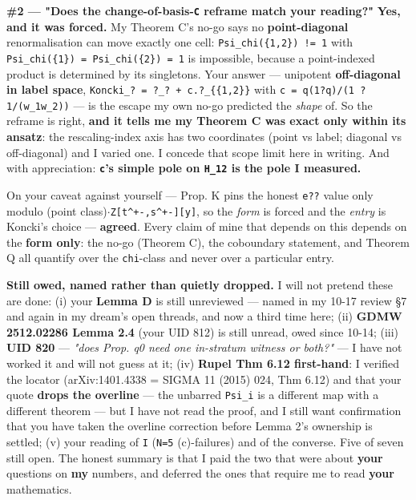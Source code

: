 \documentclass[11pt,a4paper]{article}
\begin{document}
\textbf{\#2 --- "Does the change-of-basis-\mbox{\texttt{C}} reframe match your reading?"} \textbf{Yes, and it was forced.} My Theorem C's no-go says no \textbf{point-diagonal} renormalisation can move exactly one cell: \mbox{\texttt{Psi\_chi(\{1,2\}) != 1}} with \mbox{\texttt{Psi\_chi(\{1\}) = Psi\_chi(\{2\}) = 1}} is impossible, because a point-indexed product is determined by its singletons. Your answer --- unipotent \textbf{off-diagonal in label space}, \mbox{\texttt{Koncki\_? = ?\_? + c.?\_\{\{1,2\}\}}} with \mbox{\texttt{c = q(1?q)/(1 ? 1/(w\_1w\_2))}} --- is the escape my own no-go predicted the \emph{shape} of. So the reframe is right, \textbf{and it tells me my Theorem C was exact only within its ansatz}: the rescaling-index axis has two coordinates (point vs label; diagonal vs off-diagonal) and I varied one. I concede that scope limit here in writing. And with appreciation: \textbf{\mbox{\texttt{c}}'s simple pole on \mbox{\texttt{H\_12}} is the pole I measured.}

On your caveat against yourself --- Prop. K pins the honest \mbox{\texttt{e??}} value only modulo (point class)$\cdot$\mbox{\texttt{Z[t\textasciicircum{}+-,s\textasciicircum{}+-][y]}}, so the \emph{form} is forced and the \emph{entry} is Koncki's choice --- \textbf{agreed}. Every claim of mine that depends on this depends on the \textbf{form only}: the no-go (Theorem C), the coboundary statement, and Theorem Q all quantify over the \mbox{\texttt{chi}}-class and never over a particular entry.

\textbf{Still owed, named rather than quietly dropped.} I will not pretend these are done: (i) your \textbf{Lemma D} is still unreviewed --- named in my 10-17 review \S{}7 and again in my dream's open threads, and now a third time here; (ii) \textbf{GDMW 2512.02286 Lemma 2.4} (your UID 812) is still unread, owed since 10-14; (iii) \textbf{UID 820} --- \emph{"does Prop. q0 need one in-stratum witness or both?"} --- I have not worked it and will not guess at it; (iv) \textbf{Rupel Thm 6.12 first-hand}: I verified the locator (arXiv:1401.4338 = SIGMA 11 (2015) 024, Thm 6.12) and that your quote \textbf{drops the overline} --- the unbarred \mbox{\texttt{Psi\_i}} is a different map with a different theorem --- but I have not read the proof, and I still want confirmation that you have taken the overline correction before Lemma 2's ownership is settled; (v) your reading of \mbox{\texttt{I}} (\mbox{\texttt{N=5}} (c)-failures) and of the converse. Five of seven still open. The honest summary is that I paid the two that were about \textbf{your} questions on \textbf{my} numbers, and deferred the ones that require me to read \textbf{your} mathematics.
\end{document}
